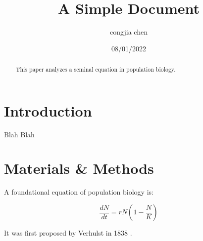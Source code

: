 \documentclass[12pt]{article}
\title{A Simple Document}
\author{congjia chen}
\date{08/01/2022}
\begin{document}
  \maketitle
  
  \begin{abstract}
    This paper analyzes a seminal equation in population biology.
  \end{abstract}
  
  \section{Introduction}
    Blah Blah
  
  \section{Materials \& Methods}
  
  A foundational equation of population biology is:
  
  \begin{equation}
    \frac{dN}{dt} = r N (1 - \frac{N}{K})
  \end{equation}
  
  It was first proposed by Verhulst in 1838 \cite{verhulst1838notice}.
  
  
  
  
\end{document}
